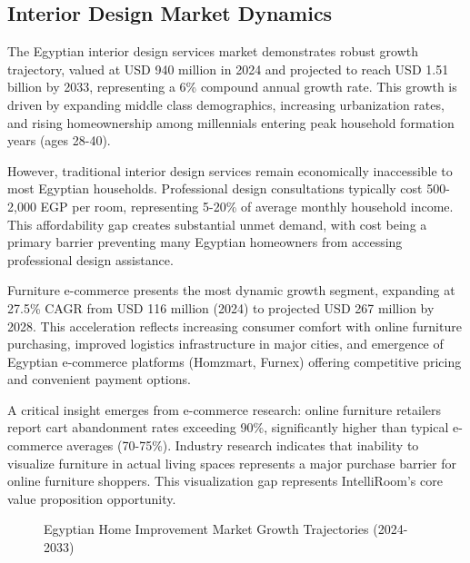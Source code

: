 \subsection{Interior Design Market Dynamics}

The Egyptian interior design services market demonstrates robust growth trajectory, valued at USD 940 million in 2024 and projected to reach USD 1.51 billion by 2033, representing a 6\% compound annual growth rate. This growth is driven by expanding middle class demographics, increasing urbanization rates, and rising homeownership among millennials entering peak household formation years (ages 28-40).

However, traditional interior design services remain economically inaccessible to most Egyptian households. Professional design consultations typically cost 500-2,000 EGP per room, representing 5-20\% of average monthly household income. This affordability gap creates substantial unmet demand, with cost being a primary barrier preventing many Egyptian homeowners from accessing professional design assistance.

Furniture e-commerce presents the most dynamic growth segment, expanding at 27.5\% CAGR from USD 116 million (2024) to projected USD 267 million by 2028. This acceleration reflects increasing consumer comfort with online furniture purchasing, improved logistics infrastructure in major cities, and emergence of Egyptian e-commerce platforms (Homzmart, Furnex) offering competitive pricing and convenient payment options.

A critical insight emerges from e-commerce research: online furniture retailers report cart abandonment rates exceeding 90\%, significantly higher than typical e-commerce averages (70-75\%). Industry research indicates that inability to visualize furniture in actual living spaces represents a major purchase barrier for online furniture shoppers. This visualization gap represents IntelliRoom's core value proposition opportunity.

\begin{figure}[htbp]
\centering
{}
\caption{Egyptian Home Improvement Market Growth Trajectories (2024-2033)}
\label{fig:egypt_market_growth}
\end{figure}


